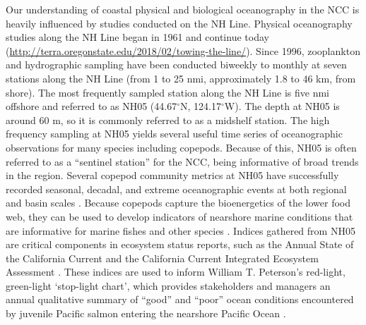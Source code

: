 \documentclass[preprint, authoryear, 12pt]{elsarticle}
\begin{document}
Our understanding of coastal physical and biological oceanography in the NCC is heavily influenced by studies conducted on the NH Line.  Physical oceanography studies along the NH Line began in 1961 and continue today (\href{http://terra.oregonstate.edu/2018/02/towing-the-line/}{http://terra.oregonstate.edu/2018/02/towing-the-line/}).  Since 1996, zooplankton and hydrographic sampling have been conducted biweekly to monthly at seven stations along the NH Line (from 1 to 25 nmi, approximately 1.8 to 46 km, from shore). The most frequently sampled station along the NH Line is five nmi offshore and referred to as NH05 (44.67$^\circ$N, 124.17$^\circ$W). The depth at NH05 is around 60 m, so it is commonly referred to as a midshelf station. The high frequency sampling at NH05 yields several useful time series of oceanographic observations for many species including copepods.  Because of this, NH05 is often referred to as a “sentinel station” for the NCC, being informative of broad trends in the region. Several copepod community metrics at NH05  have successfully recorded seasonal, decadal, and extreme oceanographic events at both regional and basin scales \citep{mackas2006zooplankton, keister2011zooplankton, fisher2015impact, peterson2017pelagic, harvey2020importance}. Because copepods capture the bioenergetics of the lower food web, they can be used to develop indicators of nearshore marine conditions that are informative for marine fishes and other species \citep{peterson2014applied}. Indices gathered from NH05 are critical components in ecosystem status reports, such as the Annual State of the California Current \citep{wells2017state, thompson2018state, thompson2019state} and the California Current Integrated Ecosystem Assessment \citep{harvey2018ecosystem, harvey2019ecosystem}. These indices are used to inform William T. Peterson’s red-light, green-light ‘stop-light chart’, which provides stakeholders and managers an annual qualitative summary of “good” and “poor” ocean conditions encountered by juvenile Pacific salmon entering the nearshore Pacific Ocean \citep[][\href{https://www.nwfsc.noaa.gov/oceanconditions}{https://www.nwfsc.noaa.gov/oceanconditions}]{peterson2014applied}.
\end{document}

